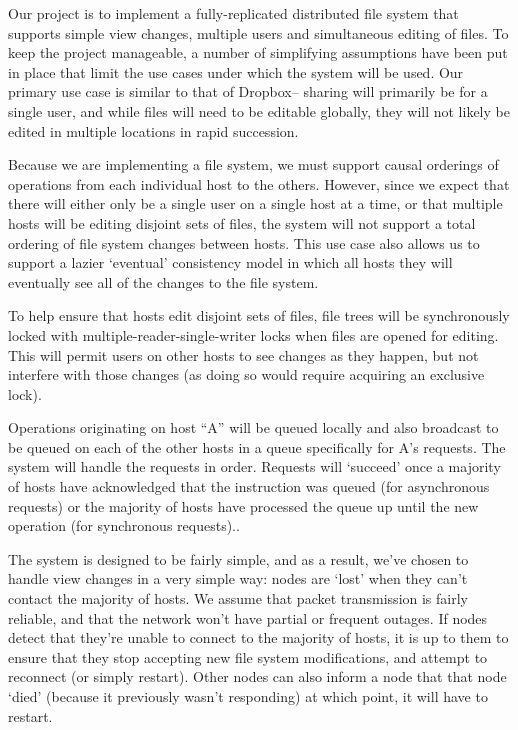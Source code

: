 Our project is to implement a fully-replicated distributed file system that
supports simple view changes, multiple users and simultaneous editing of files.
To keep the project manageable, a number of simplifying assumptions have been
put in place that limit the use cases under which the system will be used. Our
primary use case is similar to that of Dropbox-- sharing will primarily be for a
single user, and while files will need to be editable globally, they will not
likely be edited in multiple locations in rapid succession.

Because we are implementing a file system, we must support causal orderings of
operations from each individual host to the others. However, since we expect
that there will either only be a single user on a single host at a time, or that
multiple hosts will be editing disjoint sets of files, the system will not
support a total ordering of file system changes between hosts. This use case
also allows us to support a lazier ‘eventual’ consistency model in which all
hosts they will eventually see all of the changes to the file system.

To help ensure that hosts edit disjoint sets of files, file trees will be
synchronously locked with multiple-reader-single-writer locks when files are
opened for editing. This will permit users on other hosts to see changes as they
happen, but not interfere with those changes (as doing so would require
acquiring an exclusive lock).

Operations originating on host “A” will be queued locally and also broadcast to
be queued on each of the other hosts in a queue specifically for A’s requests.
The system will handle the requests in order. Requests will ‘succeed’ once a
majority of hosts have acknowledged that the instruction was queued (for
asynchronous requests) or the majority of hosts have processed the queue up
until the new operation (for synchronous requests)..

The system is designed to be fairly simple, and as a result, we’ve chosen to
handle view changes in a very simple way: nodes are ‘lost’ when they can’t
contact the majority of hosts. We assume that packet transmission is fairly
reliable, and that the network won’t have partial or frequent outages. If nodes
detect that they’re unable to connect to the majority of hosts, it is up to them
to ensure that they stop accepting new file system modifications, and attempt to
reconnect (or simply restart). Other nodes can also inform a node that that node
‘died’ (because it previously wasn’t responding) at which point, it will have to
restart.

